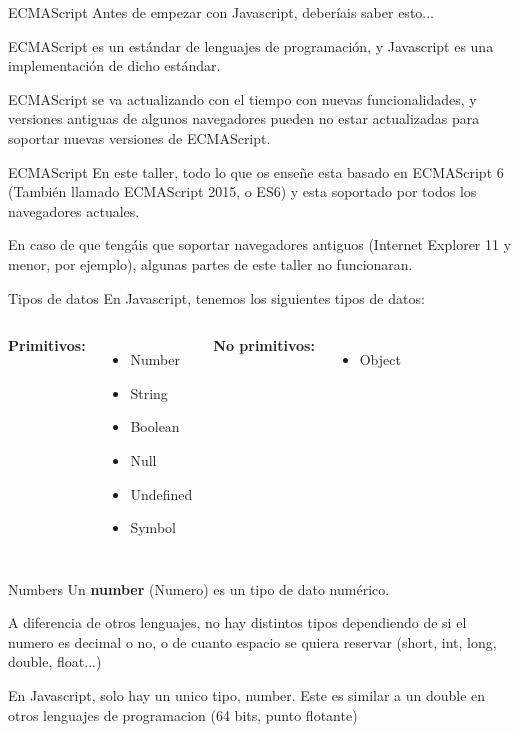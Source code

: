 \documentclass{beamer}
\begin{document}
\begin{frame}{ECMAScript}
Antes de empezar con Javascript, deberíais saber esto...

ECMAScript es un estándar de lenguajes de programación, y Javascript es una implementación de dicho estándar.

ECMAScript se va actualizando con el tiempo con nuevas funcionalidades, y versiones antiguas de algunos navegadores pueden no estar actualizadas para soportar nuevas versiones de ECMAScript.
\end{frame}

\begin{frame}{ECMAScript}
En este taller, todo lo que os enseñe esta basado en ECMAScript 6 (También llamado ECMAScript 2015, o ES6) y esta soportado por todos los navegadores actuales.

En caso de que tengáis que soportar navegadores antiguos (Internet Explorer 11 y menor, por ejemplo), algunas partes de este taller no funcionaran.
\end{frame}

\begin{frame}{Tipos de datos}
En Javascript, tenemos los siguientes tipos de datos:\bigskip

\begin{columns}[t, onlytextwidth]
                \textbf{Primitivos:}
                \begin{itemize}
                    \item Number
                    \item String
                    \item Boolean
                    \item Null
                    \item Undefined
                    \item Symbol
                \end{itemize}
            
                \textbf{No primitivos:}
                \begin{itemize}
                    \item Object
                \end{itemize}
        \end{columns}
\end{frame}

\begin{frame}{Numbers}
Un \textbf{number} (Numero) es un tipo de dato numérico.

A diferencia de otros lenguajes, no hay distintos tipos dependiendo de si el numero es decimal o no, o de cuanto espacio se quiera reservar (short, int, long, double, float...)

En Javascript, solo hay un unico tipo, number. Este es similar a un double en otros lenguajes de programacion (64 bits, punto flotante)
\end{frame}
\end{document}
